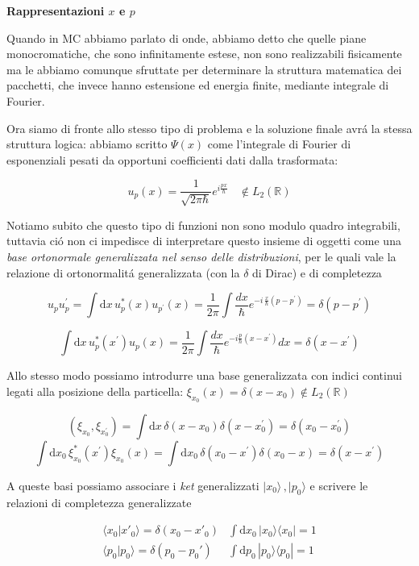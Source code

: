 \textbf{Rappresentazioni $x$ e $p$}

Quando in MC abbiamo parlato di onde, abbiamo detto che quelle piane monocromatiche, che sono infinitamente estese, non sono realizzabili fisicamente ma le abbiamo comunque sfruttate per determinare la struttura matematica dei pacchetti, che invece hanno estensione ed energia finite, mediante integrale di Fourier.

Ora siamo di fronte allo stesso tipo di problema e la soluzione finale avr\'a la stessa struttura logica: abbiamo scritto $\Psi(x)$ come l'integrale di Fourier di esponenziali pesati da opportuni coefficienti dati dalla trasformata:

$$u_{p}(x)={\frac{1}{\sqrt{2\pi\hbar}}}e^{i{\frac{p x}{\hbar}}}\ \ \ \ \notin L_{2}(\mathbb{R})$$

Notiamo subito che questo tipo di funzioni non sono modulo quadro integrabili, tuttavia ci\'o non ci impedisce di interpretare questo insieme di oggetti come una \textit{base ortonormale generalizzata nel senso delle distribuzioni}, per le quali vale la relazione di ortonormalit\'a generalizzata (con la $\delta$ di Dirac) e di completezza

$$u_{p}u_{p}^{\prime}=\int\mathrm{d}x\,u_{p}^{*}(x)u_{p^{\prime}}(x)=\frac{1}{2\pi}\int\frac{d x}{\hbar}e^{-i\,\frac{x}{\hbar}(p-p^{\prime})}=\delta(p-p^{\prime})$$

$$\int\mathrm{d}x\,u_{p}^{*}(x^{\prime})u_{p}(x)=\frac{1}{2\pi}\int\frac{d x}{\hbar}e^{-i\frac{p}{\hbar}(x-x^{\prime})}d x=\delta(x-x^{\prime})$$

Allo stesso modo possiamo introdurre una base generalizzata con indici continui legati alla posizione della particella: $\xi_{x_0} (x) = \delta(x - x_0) \notin L_2(\mathbb{R})$

$$(\xi_{x_{0}},\xi_{x_{0}^{\prime}})=\int\mathrm{d}x\,\delta(x-x_{0})\delta(x-x_{0}^{\prime})=\delta(x_{0}-x_{0}^{\prime})$$
$$\int\mathrm{d}x_{0}\,\xi_{x_{0}}^{*}(x^{\prime})\xi_{x_{0}}(x)=\int\mathrm{d}x_{0}\,\delta(x_{0}-x^{\prime})\delta(x_{0}-x)=\delta(x-x^{\prime})$$  

A queste basi possiamo associare i \textit{ket} generalizzati $|x_{0}\rangle\,,|p_{0}\rangle$ e scrivere le relazioni di completezza generalizzate 

$$\begin{matrix}\langle x_0|x'_0\rangle=\delta(x_0-x'_0)&\int\mathrm{d}x_0\,|x_0\rangle\langle x_0|=1\\ \langle p_0|p_0\rangle=\delta(p_0-p_0')&\int\mathrm{d}p_0\,|p_0\rangle\langle p_0|=1\end{matrix}$$ 

